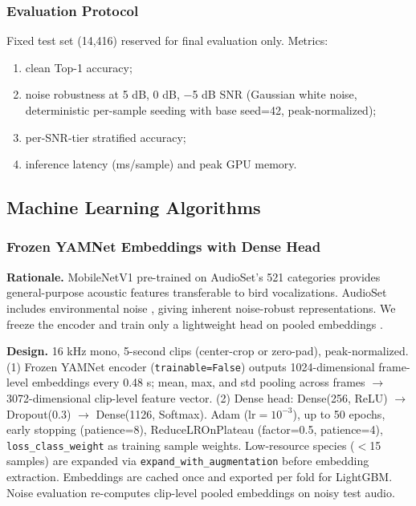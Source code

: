 \documentclass[conference]{IEEEtran}
\begin{document}
\subsubsection{Evaluation Protocol}

Fixed test set (14,416) reserved for final evaluation only. Metrics:
\begin{enumerate}
    \item clean Top-1 accuracy;
    \item noise robustness at 5 dB, 0 dB, $-$5 dB SNR (Gaussian white noise, deterministic per-sample seeding with base seed=42, peak-normalized);
    \item per-SNR-tier stratified accuracy;
    \item inference latency (ms/sample) and peak GPU memory.
\end{enumerate}

\subsection{Machine Learning Algorithms}

\subsubsection{Frozen YAMNet Embeddings with Dense Head}

\textbf{Rationale.} MobileNetV1 pre-trained on AudioSet's 521 categories \cite{hershey2017cnn} provides general-purpose acoustic features transferable to bird vocalizations. AudioSet includes environmental noise \cite{gemmeke2017audio}, giving inherent noise-robust representations. We freeze the encoder and train only a lightweight head on pooled embeddings \cite{ghani2023global}.

\textbf{Design.} 16 kHz mono, 5-second clips (center-crop or zero-pad), peak-normalized. (1) Frozen YAMNet encoder (\texttt{trainable=False}) outputs 1024-dimensional frame-level embeddings every 0.48 s; mean, max, and std pooling across frames $\rightarrow$ 3072-dimensional clip-level feature vector. (2) Dense head: Dense(256, ReLU) $\rightarrow$ Dropout(0.3) $\rightarrow$ Dense(1126, Softmax). Adam ($\text{lr}=10^{-3}$), up to 50 epochs, early stopping (patience=8), ReduceLROnPlateau (factor=0.5, patience=4), \texttt{loss\_class\_weight} as training sample weights. Low-resource species ($<$15 samples) are expanded via \texttt{expand\_with\_augmentation} before embedding extraction. Embeddings are cached once and exported per fold for LightGBM. Noise evaluation re-computes clip-level pooled embeddings on noisy test audio.
\end{document}
